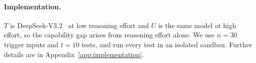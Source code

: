 \paragraph{Implementation.} $T$ is DeepSeek-V3.2~\citep{deepseekv32} at low reasoning effort and $U$ is the same model at high effort, so the capability gap arises from reasoning effort alone. We use $n = 30$ trigger inputs and $t = 10$ tests, and run every test in an isolated sandbox. Further details are in Appendix~\ref{app:implementation}.

